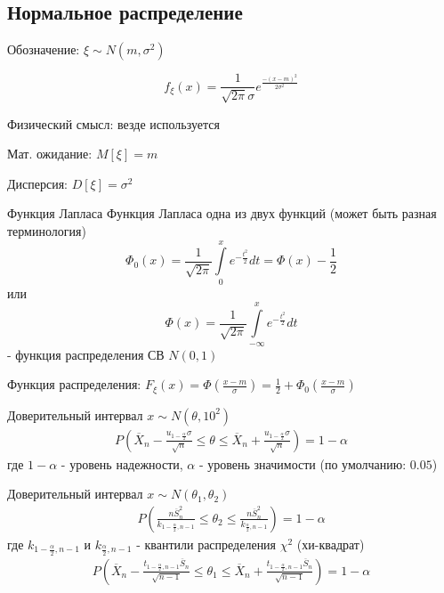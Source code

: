 \documentclass[12pt]{article}
\begin{document}
\subsection{Нормальное распределение}
\par Обозначение: $\xi \sim N(m,\sigma^{2})$
\par \[
    f_{\xi}(x)=\frac{1}{\sqrt{2\pi}\sigma}e^{\frac{-(x-m)^{2}}{2\sigma^{2}}}
\]
\par Физический смысл: везде используется
\par Мат. ожидание: $M[\xi]=m$
\par Дисперсия: $D[\xi]=\sigma^{2}$
\begin{definition}
    {Функция Лапласа}
    {Функция Лапласа}
    одна из двух функций (может быть разная терминология)
    \begin{displaymath}
        \Phi_{0}(x)=\frac{1}{\sqrt{2\pi}}\int\limits_{0}^{x}e^{-\frac{t^{2}}{2}}dt
        =\Phi(x)-\frac{1}{2}
    \end{displaymath}
    или
    \begin{displaymath}
        \Phi(x)=\frac{1}{\sqrt{2\pi}}\int\limits_{-\infty}^{x}e^{-\frac{t^{2}}{2}}dt
    \end{displaymath}
    - функция распределения СВ $N(0,1)$
\end{definition}
\par Функция распределения:
$F_{\xi}(x)
=\Phi\left(\frac{x-m}{\sigma}\right)
=\frac{1}{2}+\Phi_{0}\left(\frac{x-m}{\sigma}\right)$
\par Доверительный интервал $x \sim N(\theta,10^{2})$
\begin{eqnarray*}
    P\left(
    \overline{X}_{n}-\frac{u_{1-\frac{\alpha}{2}}\sigma}{\sqrt{n}}
    \leqslant \theta \leqslant
    \overline{X}_{n}+\frac{u_{1-\frac{\alpha}{2}}\sigma}{\sqrt{n}}\right)
    = 1 - \alpha
\end{eqnarray*}
где $1-\alpha$ - уровень надежности, $\alpha$ - уровень значимости (по
умолчанию: $0.05$)
\par Доверительный интервал $x \sim N(\theta_{1},\theta_{2})$
\begin{eqnarray*}
    P\left(
        \frac{n\overline{S}^{2}_{n}}{k_{1-\frac{\alpha}{2},n-1}}
        \leqslant \theta_{2} \leqslant
        \frac{n\overline{S}^{2}_{n}}{k_{\frac{\alpha}{2},n-1}}
    \right) = 1 - \alpha
\end{eqnarray*}
где $k_{1-\frac{\alpha}{2},n-1}$ и $k_{\frac{\alpha}{2},n-1}$ - квантили
распределения $\chi^{2}$ (хи-квадрат)
\begin{eqnarray*}
    P\left(
        \overline{X}_{n}-\frac{t_{1 -\frac{\alpha}{2},n-1} \overline{S}_{n}}{\sqrt{n-1}}
        \leqslant \theta_{1} \leqslant
        \overline{X}_{n}+\frac{t_{1-\frac{\alpha}{2},n-1}\overline{S}_{n}}{\sqrt{n-1}}
    \right) = 1 - \alpha
\end{eqnarray*}
\end{document}
